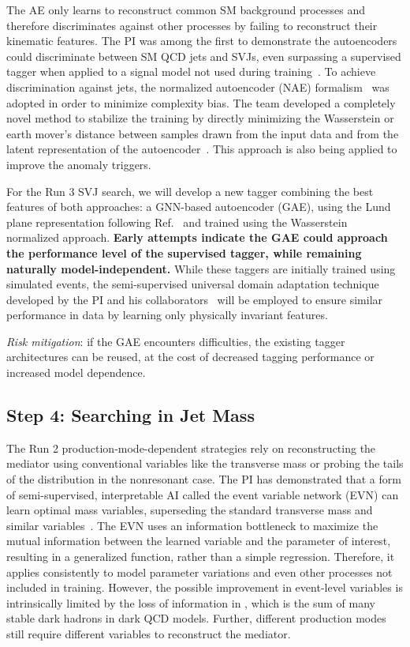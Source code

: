 The AE only learns to reconstruct common SM background processes and therefore discriminates against other processes by failing to reconstruct their kinematic features.
The PI was among the first to demonstrate the autoencoders could discriminate between SM QCD jets and SVJs, even surpassing a supervised tagger when applied to a signal model not used during training~\cite{Canelli:2021aps}.
To achieve discrimination against \ttbar jets, the normalized autoencoder (NAE) formalism~\cite{Dillon:2022mkq} was adopted in order to minimize complexity bias.
The team developed a completely novel method to stabilize the training by directly minimizing the Wasserstein or earth mover's distance
between samples drawn from the input data and from the latent representation of the autoencoder~\cite{Eble:2024tpr}.
This approach is also being applied to improve the anomaly triggers.

For the Run 3 SVJ search, we will develop a new tagger combining the best features of both approaches:
a GNN-based autoencoder (GAE), using the Lund plane representation following Ref.~\cite{Dreyer:2020brq} and trained using the Wasserstein normalized approach.
\textbf{Early attempts indicate the GAE could approach the performance level of the supervised tagger, while remaining naturally model-independent.}
While these taggers are initially trained using simulated events,
the semi-supervised universal domain adaptation technique developed by the PI and his collaborators~\cite{Ciprijanovic:2023hrw}
will be employed to ensure similar performance in data by learning only physically invariant features.

\textit{Risk mitigation}: if the GAE encounters difficulties, the existing tagger architectures can be reused, at the cost of decreased tagging performance or increased model dependence.

\subsection{Step 4: Searching in Jet Mass}\label{subsec:strategy}

The Run 2 production-mode-dependent strategies rely on reconstructing the mediator using conventional variables like the transverse mass
or probing the tails of the \ptmiss distribution in the nonresonant case.
The PI has demonstrated that a form of semi-supervised, interpretable AI called the event variable network (EVN)
can learn optimal mass variables, superseding the standard transverse mass and similar variables~\cite{Pedro:2023sdp}.
The EVN uses an information bottleneck to maximize the mutual information between the learned variable and the parameter of interest,
resulting in a generalized function, rather than a simple regression.
Therefore, it applies consistently to model parameter variations and even other processes not included in training.
However, the possible improvement in event-level variables is intrinsically limited by the loss of information in \ptmiss,
which is the sum of many stable dark hadrons in dark QCD models.
Further, different production modes still require different variables to reconstruct the mediator.

